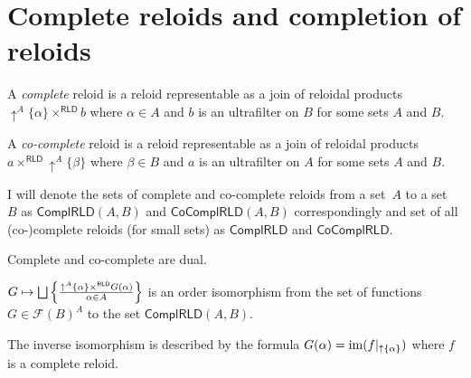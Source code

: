 \section{Complete reloids and completion of reloids}
\begin{defn}
A \emph{complete} reloid is a reloid representable
as a join of reloidal products $\uparrow^{A}\{\alpha\}\times^{\mathsf{RLD}}b$
where $\alpha\in A$ and $b$ is an ultrafilter on $B$ for some sets
$A$ and $B$.
\end{defn}

\begin{defn}
A \emph{co-complete} reloid is a reloid
representable as a join of reloidal products $a\times^{\mathsf{RLD}}\uparrow^{A}\{\beta\}$
where $\beta\in B$ and $a$ is an ultrafilter on $A$ for some sets
$A$ and $B$.
\end{defn}
I will denote the sets of complete and co-complete reloids from a set~$A$ to a set~$B$ as
$\mathsf{ComplRLD}(A,B)$ and $\mathsf{CoComplRLD}(A,B)$ correspondingly and
set of all (co-)complete reloids (for small sets)
as $\mathsf{ComplRLD}$ and $\mathsf{CoComplRLD}$.
\begin{obvious}
Complete and co-complete are dual.\end{obvious}
\begin{thm}
\label{complrld-rep}$G\mapsto\bigsqcup\setcond{\uparrow^{A}\{\alpha\}\times^{\mathsf{RLD}}G(\alpha)}{\alpha\in A}$
is an order isomorphism from the set of functions $G\in\mathscr{F}(B)^{A}$
to the set $\mathsf{ComplRLD}(A,B)$.

The inverse isomorphism is described by the formula $G(\alpha)=\operatorname{im}(f|_{\uparrow \{\alpha\}})$
where $f$ is a complete reloid.\end{thm}
